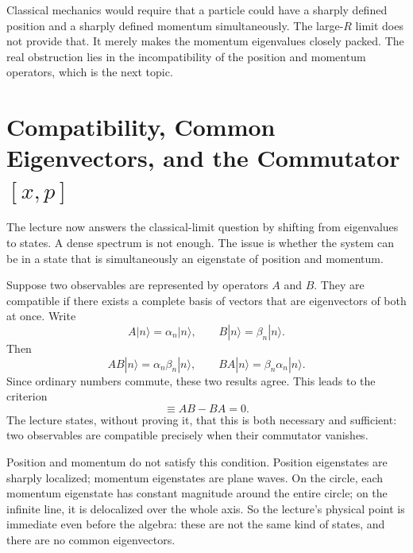 Classical mechanics would require that a particle could have a sharply defined position and a sharply defined momentum simultaneously. The large-\(R\) limit does not provide that. It merely makes the momentum eigenvalues closely packed. The real obstruction lies in the incompatibility of the position and momentum operators, which is the next topic.

\section{Compatibility, Common Eigenvectors, and the Commutator \([x,p]\)}

The lecture now answers the classical-limit question by shifting from eigenvalues to states. A dense spectrum is not enough. The issue is whether the system can be in a state that is simultaneously an eigenstate of position and momentum.

Suppose two observables are represented by operators \(A\) and \(B\). They are compatible if there exists a complete basis of vectors that are eigenvectors of both at once. Write
\begin{equation}
A|n\rangle=\alpha_n|n\rangle,
\qquad
B|n\rangle=\beta_n|n\rangle.
\end{equation}
Then
\begin{equation}
AB|n\rangle=\alpha_n\beta_n|n\rangle,
\qquad
BA|n\rangle=\beta_n\alpha_n|n\rangle.
\end{equation}
Since ordinary numbers commute, these two results agree. This leads to the criterion
\begin{equation}
[A,B]\equiv AB-BA=0.
\end{equation}
The lecture states, without proving it, that this is both necessary and sufficient: two observables are compatible precisely when their commutator vanishes.

Position and momentum do not satisfy this condition. Position eigenstates are sharply localized; momentum eigenstates are plane waves. On the circle, each momentum eigenstate has constant magnitude around the entire circle; on the infinite line, it is delocalized over the whole axis. So the lecture's physical point is immediate even before the algebra: these are not the same kind of states, and there are no common eigenvectors.

